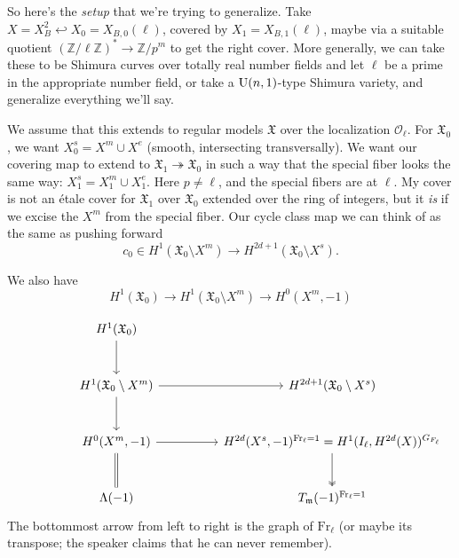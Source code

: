 \documentclass[reqno]{amsart} 
\begin{document}
So here's the \emph{setup} that we're trying to generalize.  Take $X = X_B^2 \hookleftarrow X_0 = X_{B, 0}(\ell)$, covered by $X_1 = X_{B, 1}(\ell)$, maybe via a suitable quotient $(\mathbb{Z} / \ell \mathbb{Z})^\ast \rightarrow \mathbb{Z} /p^m$ to get the right cover.  More generally, we can take these to be Shimura curves over totally real number fields and let $\ell$ be a prime in the appropriate number field, or take a $\operatorname{U}(n,1)$-type Shimura variety, and generalize everything we'll say.

We assume that this extends to regular models $\mathfrak{X}$ over the localization $\mathcal{O} _\ell$.  For $\mathfrak{X}_0$, we want $X_0^s = X^m \cup X^{e}$ (smooth, intersecting transversally).  We want our covering map to extend to $\mathfrak{X}_1 \twoheadrightarrow \mathfrak{X}_0$ in such a way that the special fiber looks the same way: $X_1^s = X_1^m \cup X_1^{e}$.  Here $p \neq \ell$, and the special fibers are at $\ell$.  My cover is not an {\'e}tale cover for $\mathfrak{X}_1$ over $\mathfrak{X}_0$ extended over the ring of integers, but it \emph{is} if we excise the $X^m$ from the special fiber.  Our cycle class map we can think of as the same as pushing forward
\begin{equation*}
  c_0 \in H^1(\mathfrak{X}_0 \setminus X^m) \rightarrow
  H^{2 d + 1}(\mathfrak{X}_0 \setminus X^s).
\end{equation*}


We  also have
\begin{equation*}
  H^1(\mathfrak{X}_0) \rightarrow H^1(\mathfrak{X}_0 \setminus X^m)
  \rightarrow H^0(X^m, -1)
\end{equation*}


\begin{equation*}
  \begin{tikzcd}[column sep=huge, row sep=large]
    & H^1(\mathfrak{X}_0) \arrow[d] & \\
    & H^1(\mathfrak{X}_0 \setminus X^m) \arrow[r] \arrow[d] & H^{2d+1}(\mathfrak{X}_0 \setminus X^s) \\
    & H^0(X^m, -1) \arrow[r] \arrow[d, equal] & H^{2d}(X^s, -1)^{\mathrm{Fr}_{\ell} = 1} = H^1(I_{\ell}, H^{2d}(X))^{G_{F_{\ell}}} \arrow[d, twoheadrightarrow] \\
    & \Lambda(-1) & T_{\mathfrak{m}}(-1)^{\mathrm{Fr}_{\ell} = 1}
  \end{tikzcd}
\end{equation*}
The bottommost arrow from left to right is the graph of $\mathrm{Fr}_{\ell}$ (or maybe its transpose; the speaker claims that he can never remember).
\end{document}
